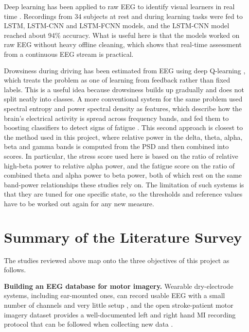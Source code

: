 Deep learning has been applied to raw EEG to identify visual learners in real time
\cite{jawed2024visual}. Recordings from 34 subjects at rest and during learning tasks were
fed to LSTM, LSTM-CNN and LSTM-FCNN models, and the LSTM-CNN model reached about 94\%
accuracy. What is useful here is that the models worked on raw EEG without heavy offline
cleaning, which shows that real-time assessment from a continuous EEG stream is practical.

Drowsiness during driving has been estimated from EEG using deep Q-learning
\cite{ming2021drowsiness}, which treats the problem as one of learning from feedback rather
than fixed labels. This is a useful idea because drowsiness builds up gradually and does not
split neatly into classes. A more conventional system for the same problem used spectral
entropy and power spectral density as features, which describe how the brain's electrical
activity is spread across frequency bands, and fed them to boosting classifiers to detect
signs of fatigue \cite{jiri2025drowsiness}. This second approach is closest to the method
used in this project, where relative power in the delta, theta, alpha, beta and gamma bands
is computed from the PSD and then combined into scores. In particular, the stress score used
here is based on the ratio of relative high-beta power to relative alpha power, and the
fatigue score on the ratio of combined theta and alpha power to beta power, both of which
rest on the same band-power relationships these studies rely on. The limitation of such
systems is that they are tuned for one specific state, so the thresholds and reference
values have to be worked out again for any new measure.

\section{Summary of the Literature Survey}

The studies reviewed above map onto the three objectives of this project as follows.

\textbf{Building an EEG database for motor imagery.} Wearable dry-electrode systems,
including ear-mounted ones, can record usable EEG with a small number of channels and very
little setup \cite{mullen2015wearable, kappel2019earEEG}, and the open stroke-patient motor
imagery dataset provides a well-documented left and right hand MI recording protocol that
can be followed when collecting new data \cite{liu2024mi}.

